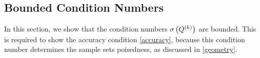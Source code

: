 % 


% 



\subsection{Bounded Condition Numbers}
\label{bounded_condition_numbers_section}
In this section, we show that the condition numbers ${\sigma}\left({Q^{(k)}}\right)$ are bounded.
This is required to show the accuracy condition \cref{accuracy}, because this condition number determines the sample sets poisedness, as discussed in \cref{geometry}.

